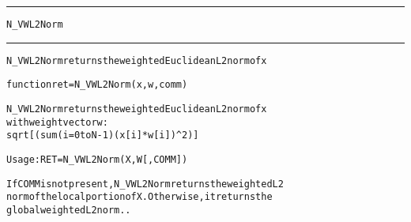 \begin{samepage}
\hrule
\begin{center}
{\large \verb!N_VWL2Norm!}
\label{p:N_VWL2Norm}
\end{center}
\hrule\vspace{0.1in}



\begin{alltt}
N_VWL2Norm returns the weighted Euclidean L2 norm of x
\end{alltt}

\end{samepage}



\begin{samepage}


\begin{alltt}
function ret = N_VWL2Norm(x,w,comm) 
\end{alltt}

\end{samepage}



\begin{alltt}
N_VWL2Norm returns the weighted Euclidean L2 norm of x 
   with weight vector w:
   sqrt [(sum (i = 0 to N-1) {(x[i]*w[i])^2})]

   Usage:  RET = N_VWL2Norm ( X, W [, COMM] )

If COMM is not present, N_VWL2Norm returns the weighted L2
norm of the local portion of X. Otherwise, it returns the 
global weighted L2 norm..
\end{alltt}





 



\vspace{0.1in}